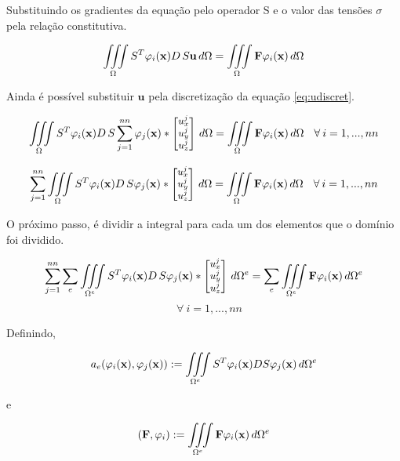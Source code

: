 Substituindo os gradientes da equação pelo operador S e o valor das tensões $\sigma$ pela relação constitutiva.

\begin{equation}
\iiint\limits_{\Omega} S^T \varphi_i(\mathbf{x}) D\,S\mathbf{u}  \, d\Omega
= \iiint\limits_{\Omega} \mathbf{F}\varphi_i(\mathbf{x}) \, d\Omega
\end{equation}

Ainda é possível substituir $\mathbf{u}$ pela discretização da equação \ref{eq:udiscret}.

\begin{equation}\small
\iiint\limits_{\Omega} S^T \varphi_i(\mathbf{x}) D\,S \sum_{j=1}^{nn}  \varphi_j(\mathbf{x})
 * \begin{bmatrix} u^j_x \\ u^j_y \\ u^j_z \end{bmatrix}
 \, d\Omega   =  \iiint\limits_{\Omega} \mathbf{F}\varphi_i(\mathbf{x}) \, d\Omega \quad \forall \: i=1,...,nn
\end{equation}


\begin{equation}\small
\sum_{j=1}^{nn} \iiint\limits_{\Omega} S^T \varphi_i(\mathbf{x}) D\,S   \varphi_j(\mathbf{x})
 * \begin{bmatrix} u^j_x \\ u^j_y \\ u^j_z \end{bmatrix}
 \, d\Omega   =  \iiint\limits_{\Omega} \mathbf{F}\varphi_i(\mathbf{x}) \, d\Omega \quad \forall \: i=1,...,nn
\end{equation}

O próximo passo, é dividir a integral para cada um dos elementos que o domínio foi dividido.

\begin{equation*}\small
\sum_{j=1}^{nn} \sum\limits_e \iiint\limits_{\Omega^e} S^T \varphi_i(\mathbf{x}) D\,S  \varphi_j(\mathbf{x})
 * \begin{bmatrix} u^j_x \\ u^j_y \\ u^j_z \end{bmatrix}
 \, d\Omega^e   =  \sum\limits_e \iiint\limits_{\Omega^e} \mathbf{F}\varphi_i(\mathbf{x}) \, d\Omega^e
\end{equation*}
\begin{equation*}
 \quad \forall \: i=1,...,nn
\end{equation*}

Definindo,

\begin{equation} \label{eq:ae_def}
 a_e(\varphi_i(\mathbf{x}),\varphi_j(\mathbf{x})) := \iiint\limits_{\Omega^e} S^T\varphi_i(\mathbf{x}) D S\varphi_j(\mathbf{x}) \, d\Omega^e
\end{equation}

e

\begin{equation}
(\mathbf{F}, \varphi_{i}) := \iiint\limits_{\Omega^e} \mathbf{F}\varphi_i(\mathbf{x}) \, d\Omega^e
\end{equation}

